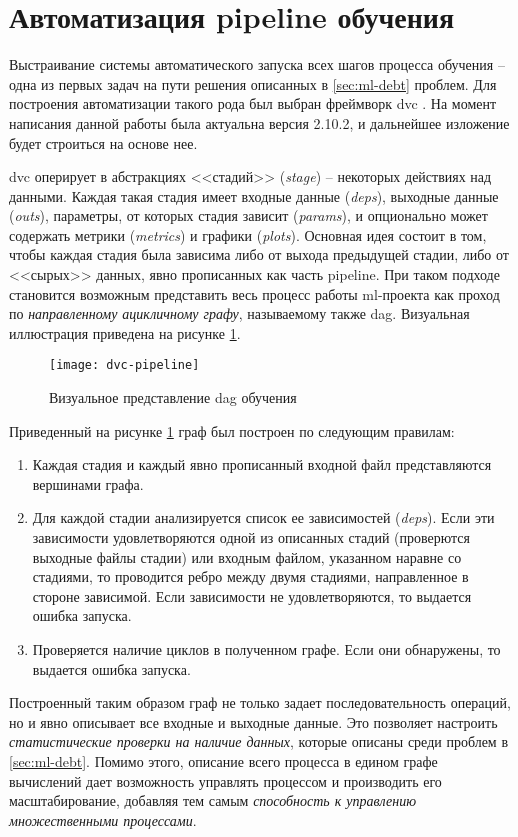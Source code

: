 \section{Автоматизация \gls{pipeline} обучения}
\label{sec:dvc-pipeline}
Выстраивание системы автоматического запуска всех шагов процесса обучения -- одна из первых задач на пути решения описанных в \ref{sec:ml-debt} проблем.
Для построения автоматизации такого рода был выбран фреймворк \gls{dvc} \cite{cite:dvc}.
На момент написания данной работы была актуальна версия 2.10.2, и дальнейшее изложение будет строиться на основе нее.

\Gls{dvc} оперирует в абстракциях <<стадий>> (\textit{stage}) -- некоторых действиях над данными.
Каждая такая стадия имеет входные данные (\textit{deps}), выходные данные (\textit{outs}), параметры, от которых стадия зависит (\textit{params}), и опционально может содержать метрики (\textit{metrics}) и графики (\textit{plots}).
Основная идея состоит в том, чтобы каждая стадия была зависима либо от выхода предыдущей стадии, либо от <<сырых>> данных, явно прописанных как часть \gls{pipeline}.
При таком подходе становится возможным представить весь процесс работы \acrshort{ml}-проекта как проход по \textit{направленному ацикличному графу}, называемому также \acrfull{dag}.
Визуальная иллюстрация приведена на рисунке \ref{fig:dvc-pipeline}.

\begin{figure}[!h]
    \centering
    \texttt{[image: dvc-pipeline]}
    \caption{Визуальное представление \acrshort{dag} обучения}
    \label{fig:dvc-pipeline}
\end{figure}

Приведенный на рисунке \ref{fig:dvc-pipeline} граф был построен по следующим правилам:
\begin{enumerate}
    \item Каждая стадия и каждый явно прописанный входной файл представляются вершинами графа.
    \item Для каждой стадии анализируется список ее зависимостей (\textit{deps}).
        Если эти зависимости удовлетворяются одной из описанных стадий (проверются выходные файлы стадии) или входным файлом, указанном наравне со стадиями, то проводится ребро между двумя стадиями, направленное в стороне зависимой.
        Если зависимости не удовлетворяются, то выдается ошибка запуска.
    \item Проверяется наличие циклов в полученном графе.
        Если они обнаружены, то выдается ошибка запуска.
\end{enumerate}
Построенный таким образом граф не только задает последовательность операций, но и явно описывает все входные и выходные данные.
Это позволяет настроить \textit{статистические проверки на наличие данных}, которые описаны среди проблем в \ref{sec:ml-debt}.
Помимо этого, описание всего процесса в едином графе вычислений дает возможность управлять процессом и производить его масштабирование, добавляя тем самым \textit{способность к управлению множественными процессами}.

